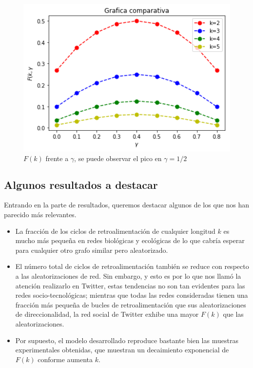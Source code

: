 \documentclass[1p]{elsarticle}
\begin{document}
\begin{figure}
	\centering
	\includegraphics[width=12cm]{graf_1.png}
	\caption{$F(k)$ frente a $\gamma$, se puede observar el pico en $\gamma=1/2$}
	\label{h}
\end{figure}




\subsection{Algunos resultados a destacar}
Entrando en la parte de resultados, queremos destacar algunos de los que nos han parecido más relevantes.
\begin{itemize}
	\item La fracción de los ciclos de retroalimentación de cualquier longitud $k$ es mucho más pequeña en redes biológicas y ecológicas de lo que cabría esperar para cualquier otro grafo similar pero aleatorizado.
	\item El número total de ciclos de retroalimentación también se reduce 
	con respecto a las aleatorizaciones de red. Sin embargo, y esto es por lo que nos llamó la atención realizarlo en Twitter, estas tendencias no son tan evidentes para las redes socio-tecnológicas; mientras que todas las redes consideradas tienen una fracción más pequeña de bucles de retroalimentación que sus aleatorizaciones de direccionalidad, la red social de Twitter exhibe una mayor $F(k)$ que las aleatorizaciones.
	\item Por supuesto, el modelo desarrollado reproduce bastante bien las muestras experimentales obtenidas, que muestran un decaimiento exponencial de $F(k)$ conforme aumenta $k$.
\end{itemize}
\end{document}
